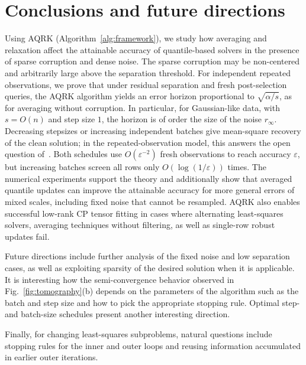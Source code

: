 \documentclass[pdflatex,sn-mathphys-num]{sn-jnl}
\theoremstyle{thmstyleone}
\theoremstyle{thmstylethree}
\begin{document}
\section{Conclusions and future directions}
\label{sec:conclusions}

Using AQRK (Algorithm~\ref{alg:framework}), we study how averaging and relaxation affect the attainable accuracy of
quantile-based solvers in the presence of sparse corruption and dense noise. The sparse
corruption may be non-centered and arbitrarily large above the separation
threshold. 
For independent repeated observations, we prove that under residual separation and
fresh post-selection queries, the AQRK algorithm yields an error horizon proportional to
$\sqrt{\alpha/s}$, as for averaging without corruption. In particular, for Gaussian-like data, with $s = O(n)$ and step size $1$, the horizon is of order the size of the noise $r_\infty$. Decreasing stepsizes or increasing independent batches give
mean-square recovery of the clean solution; in the repeated-observation model,
this answers the open question of~\cite{coria2024quantile}. Both schedules use
$O(\varepsilon^{-2})$ fresh observations to reach accuracy $\varepsilon$, but
increasing batches screen all rows only $O(\log(1/\varepsilon))$ times. The numerical experiments support the theory and additionally show that averaged quantile updates can
improve the attainable accuracy for more general errors of mixed scales, including fixed noise that cannot be resampled. 
AQRK also enables successful low-rank CP tensor fitting in cases where
alternating least-squares solvers, averaging techniques without filtering, as well as single-row robust updates  fail.

Future directions include further analysis of the fixed noise and low separation cases, as well as exploiting sparsity of the desired solution when it is applicable. It is interesting how the semi-convergence behavior observed in Fig.~\ref{fig:tomography}(b) depends on the parameters of the algorithm such as the batch and step size and how to pick the appropriate stopping rule. Optimal step- and batch-size schedules present another interesting direction.

Finally, for changing least-squares subproblems,
natural questions include stopping rules for the inner and outer loops and
reusing information accumulated in earlier outer iterations.

\backmatter


\end{document}
